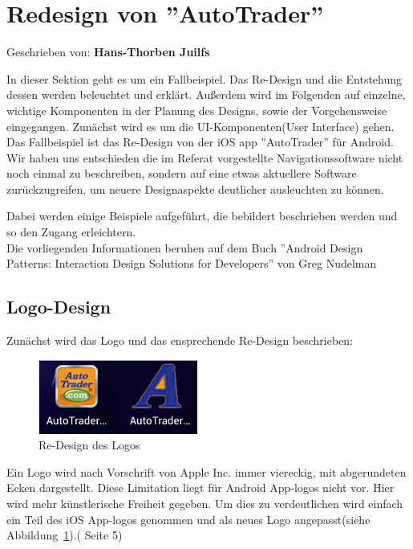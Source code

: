 
\section{Redesign von ''AutoTrader''}

Geschrieben von: \textbf{Hans-Thorben Juilfs}
\newline

In dieser Sektion geht es um ein Fallbeispiel. Das Re-Design und die Entstehung dessen werden beleuchtet und erklärt. Außerdem wird im Folgenden auf einzelne, wichtige Komponenten in der Planung des Designs, sowie der Vorgehensweise eingegangen. Zunächst wird es um die UI-Komponenten(User Interface) gehen.\\

Das Fallbeispiel ist das Re-Design von der iOS app ''AutoTrader'' für Android. Wir haben uns entschieden die im Referat vorgestellte Navigationssoftware nicht noch einmal zu beschreiben, sondern auf eine etwas aktuellere Software zurückzugreifen, um neuere Designaspekte deutlicher ausleuchten zu können.

Dabei werden einige Beispiele aufgeführt, die bebildert beschrieben werden und so den Zugang erleichtern.\\

Die vorliegenden Informationen beruhen auf dem Buch ''Android Design Patterns: Interaction Design Solutions for Developers'' von Greg Nudelman\\


\subsection{Logo-Design}
\label{sub:logodesign}
Zunächst wird das Logo und das ensprechende Re-Design beschrieben:\\

\begin{figure}[h]
 \centering
 \includegraphics[height=0.10\textheight]{img/logo.png}
 \caption{Re-Design des Logos}
 \label{fig:logo}
\end{figure}

Ein Logo wird nach Vorschrift von Apple Inc. immer viereckig, mit abgerundeten Ecken dargestellt. Diese Limitation liegt für Android App-logos nicht vor. Hier wird mehr künstlerische Freiheit gegeben. Um dies zu verdeutlichen wird einfach ein Teil des iOS App-logos genommen und als neues Logo angepasst(siehe Abbildung~\ref{fig:logo}).(\cite{AndroidDesignPatterns} Seite 5)

